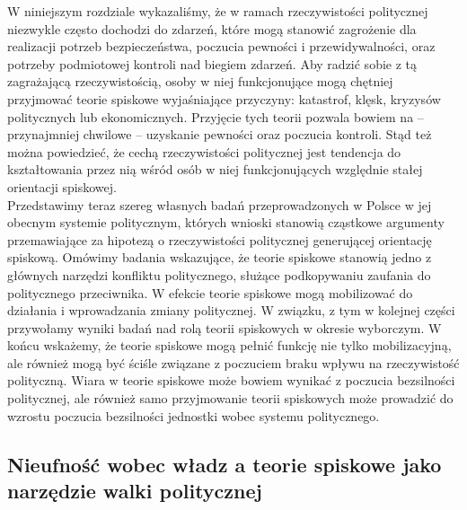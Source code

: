 \documentclass[man]{apa6}
\begin{document}
    W niniejszym rozdziale wykazaliśmy, że w ramach rzeczywistości politycznej niezwykle często dochodzi do zdarzeń, które mogą stanowić zagrożenie dla realizacji potrzeb bezpieczeństwa, poczucia pewności i przewidywalności, oraz potrzeby podmiotowej kontroli nad biegiem zdarzeń. Aby radzić sobie z tą zagrażającą rzeczywistością, osoby w niej funkcjonujące mogą chętniej przyjmować teorie spiskowe wyjaśniające przyczyny: katastrof, klęsk, kryzysów politycznych lub ekonomicznych. Przyjęcie tych teorii pozwala bowiem na -- przynajmniej chwilowe -- uzyskanie pewności oraz poczucia kontroli. Stąd też można powiedzieć, że cechą rzeczywistości politycznej jest tendencja do kształtowania przez nią wśród osób w niej funkcjonujących względnie stałej orientacji spiskowej.\\
    Przedstawimy teraz szereg własnych badań przeprowadzonych w Polsce w jej obecnym systemie politycznym, których wnioski stanowią cząstkowe argumenty przemawiające za hipotezą o rzeczywistości politycznej generującej orientację spiskową. Omówimy badania wskazujące, że teorie spiskowe stanowią jedno z głównych narzędzi konfliktu politycznego, służące podkopywaniu zaufania do politycznego przeciwnika. W efekcie teorie spiskowe mogą mobilizować do działania i wprowadzania zmiany politycznej. W związku, z tym w kolejnej części przywołamy wyniki badań nad rolą teorii spiskowych w okresie wyborczym. W końcu wskażemy, że teorie spiskowe mogą pełnić funkcję nie tylko mobilizacyjną, ale również mogą być ściśle związane z poczuciem braku wpływu na rzeczywistość polityczną. Wiara w teorie spiskowe może bowiem wynikać z poczucia bezsilności politycznej, ale również samo przyjmowanie teorii spiskowych może prowadzić do wzrostu poczucia bezsilności jednostki wobec systemu politycznego.


	\subsection{Nieufność wobec władz a teorie spiskowe jako narzędzie walki politycznej}
\end{document}

